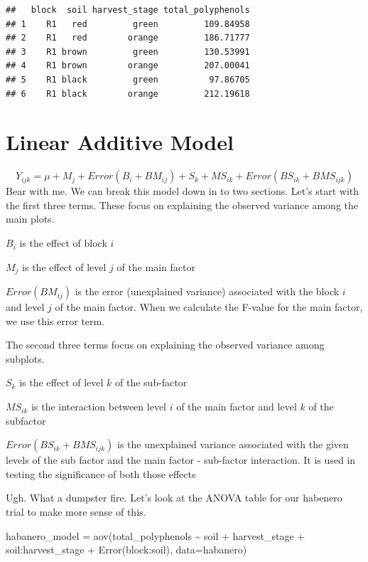 \documentclass[
]{book}
\newenvironment{Shaded}{\begin{snugshade}}{\end{snugshade}}
\newcommand{\AttributeTok}[1]{\textcolor[rgb]{0.77,0.63,0.00}{#1}}
\newcommand{\FunctionTok}[1]{\textcolor[rgb]{0.00,0.00,0.00}{#1}}
\newcommand{\NormalTok}[1]{#1}
\newcommand{\OtherTok}[1]{\textcolor[rgb]{0.56,0.35,0.01}{#1}}
\newcommand{\SpecialCharTok}[1]{\textcolor[rgb]{0.00,0.00,0.00}{#1}}
\begin{document}
\begin{verbatim}
##   block  soil harvest_stage total_polyphenols
## 1    R1   red         green         109.84958
## 2    R1   red        orange         186.71777
## 3    R1 brown         green         130.53991
## 4    R1 brown        orange         207.00041
## 5    R1 black         green          97.86705
## 6    R1 black        orange         212.19618
\end{verbatim}

\hypertarget{linear-additive-model-3}{%
\section{Linear Additive Model}\label{linear-additive-model-3}}

\[ Y_{ijk} = \mu + M_{j} + Error(B_i + BM_{ij}) + S_{k} + MS_{ik} + Error(BS_{ik}+BMS_{ijk})\]
Bear with me. We can break this model down in to two sections. Let's start with the first three terms. These focus on explaining the observed variance among the main plots.

\(B_i\) is the effect of block \(i\)

\(M_j\) is the effect of level \(j\) of the main factor

\(Error(BM_{ij})\) is the error (unexplained variance) associated with the block \(i\) and level \(j\) of the main factor. When we calculate the F-value for the main factor, we use this error term.

The second three terms focus on explaining the observed variance among subplots.

\(S_k\) is the effect of level \(k\) of the sub-factor

\(MS_{ik}\) is the interaction between level \(i\) of the main factor and level \(k\) of the subfactor

\(Error(BS_{ik}+BMS_{ijk})\) is the unexplained variance associated with the given levels of the sub factor and the main factor - sub-factor interaction. It is used in testing the significance of both those effects

Ugh. What a dumpster fire. Let's look at the ANOVA table for our habenero trial to make more sense of this.

\begin{Shaded}
\begin{Highlighting}[]
\NormalTok{habanero\_model }\OtherTok{=} \FunctionTok{aov}\NormalTok{(total\_polyphenols }\SpecialCharTok{\textasciitilde{}}\NormalTok{ soil }\SpecialCharTok{+}\NormalTok{ harvest\_stage }\SpecialCharTok{+}\NormalTok{ soil}\SpecialCharTok{:}\NormalTok{harvest\_stage }\SpecialCharTok{+} \FunctionTok{Error}\NormalTok{(block}\SpecialCharTok{:}\NormalTok{soil), }\AttributeTok{data=}\NormalTok{habanero)}
\end{Highlighting}
\end{Shaded}
\end{document}

